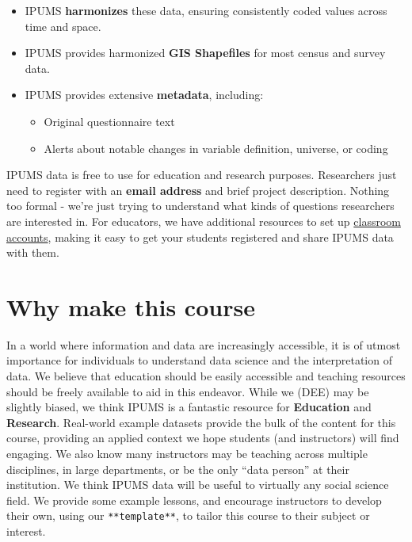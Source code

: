 \documentclass[
]{book}
\providecommand{\tightlist}{%
  \setlength{\itemsep}{0pt}\setlength{\parskip}{0pt}}
\begin{document}
\begin{itemize}
\tightlist
\item
  IPUMS \textbf{harmonizes} these data, ensuring consistently coded values across time and space.
\item
  IPUMS provides harmonized \textbf{GIS Shapefiles} for most census and survey data.
\item
  IPUMS provides extensive \textbf{metadata}, including:

  \begin{itemize}
  \tightlist
  \item
    Original questionnaire text
  \item
    Alerts about notable changes in variable definition, universe, or coding
  \end{itemize}
\end{itemize}

IPUMS data is free to use for education and research purposes. Researchers just need to register with an \textbf{email address} and brief project description. Nothing too formal - we're just trying to understand what kinds of questions researchers are interested in. For educators, we have additional resources to set up \href{}{classroom accounts}, making it easy to get your students registered and share IPUMS data with them.

\hypertarget{why-make-this-course}{%
\section*{Why make this course}\label{why-make-this-course}}

In a world where information and data are increasingly accessible, it is of utmost importance for individuals to understand data science and the interpretation of data. We believe that education should be easily accessible and teaching resources should be freely available to aid in this endeavor. While we (DEE) may be slightly biased, we think IPUMS is a fantastic resource for \textbf{Education} and \textbf{Research}. Real-world example datasets provide the bulk of the content for this course, providing an applied context we hope students (and instructors) will find engaging. We also know many instructors may be teaching across multiple disciplines, in large departments, or be the only ``data person'' at their institution. We think IPUMS data will be useful to virtually any social science field. We provide some example lessons, and encourage instructors to develop their own, using our \texttt{**template**}, to tailor this course to their subject or interest.
\end{document}
